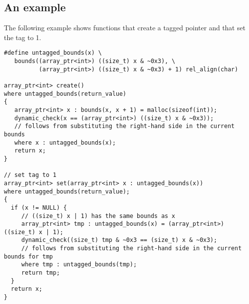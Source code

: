 \subsection{An example}

The following example shows functions that create a tagged pointer and 
that set the tag to 1.

\begin{verbatim}
#define untagged_bounds(x) \
   bounds((array_ptr<int>) ((size_t) x & ~0x3), \
          (array_ptr<int>) ((size_t) x & ~0x3) + 1) rel_align(char)

array_ptr<int> create() 
where untagged_bounds(return_value)
{
   array_ptr<int> x : bounds(x, x + 1) = malloc(sizeof(int));
   dynamic_check(x == (array_ptr<int>) ((size_t) x & ~0x3));
   // follows from substituting the right-hand side in the current bounds
   where x : untagged_bounds(x); 
   return x;
}

// set tag to 1
array_ptr<int> set(array_ptr<int> x : untagged_bounds(x)) 
where untagged_bounds(return_value);
{
  if (x != NULL) {
     // ((size_t) x | 1) has the same bounds as x                   
     array_ptr<int> tmp : untagged_bounds(x) = (array_ptr<int>) ((size_t) x | 1);
     dynamic_check((size_t) tmp & ~0x3 == (size_t) x & ~0x3);
     // follows from substituting the right-hand side in the current bounds for tmp
     where tmp : untagged_bounds(tmp);
     return tmp;
  }
  return x;
}
\end{verbatim}